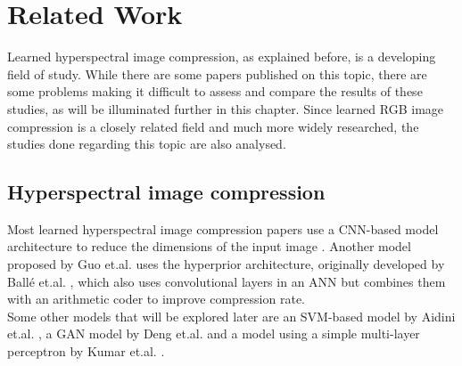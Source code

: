 \chapter{Related Work\label{cha:chapter2}}
Learned hyperspectral image compression, as explained before, is a developing field of study. While there are some papers published on this topic, there are some problems making it difficult to assess and compare the results of these studies, as will be illuminated further in this chapter. Since learned RGB image compression is a closely related field and much more widely researched, the studies done regarding this topic are also analysed.
\section{Hyperspectral image compression \label{sec:ch2hyperspectral}}
Most learned hyperspectral image compression papers use a CNN-based model architecture to reduce the dimensions of the input image \citep{kuester_1d-convolutional_2021}\citep{kuester_transferability_2022}\citep{la_grassa_hyperspectral_2022}. Another model proposed by Guo et.al. \citep{guo_learned_2021} uses the hyperprior architecture, originally developed by Ballé et.al. \citep{balle_end--end_2017}, which also uses convolutional layers in an ANN but combines them with an arithmetic coder to improve compression rate.\\
Some other models that will be explored later are an SVM-based model by Aidini et.al. \citep{aidini_hyperspectral_2019}, a GAN model by Deng et.al. \citep{deng_learning-based_2020} and a model using a simple multi-layer perceptron by Kumar et.al. \citep{leal-taixe_onboard_2019}.
